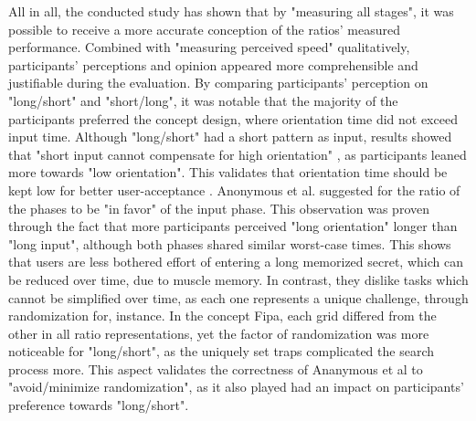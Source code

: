All in all, the conducted study has shown that by "measuring all stages", it was possible to receive a more accurate conception of the ratios' measured performance. Combined with "measuring perceived speed" qualitatively, participants' perceptions and opinion appeared more comprehensible and justifiable during the evaluation. By comparing participants' perception on "long/short" and "short/long", it was notable that the majority of the participants preferred the concept design, where orientation time did not exceed input time. Although "long/short" had a short pattern as input, results showed that "short input cannot compensate for high orientation" \cite{anonymous}, as participants leaned more towards "low orientation". This validates that orientation time should be kept low for better user-acceptance \cite{anonymous}. Anonymous et al. \cite{anonymous} suggested for the ratio of the phases to be "in favor" of the input phase. This observation was proven through the fact that more participants perceived "long orientation" longer than "long input", although both phases shared similar worst-case times. This shows that users are less bothered effort of entering a long memorized secret, which can be reduced over time, due to muscle memory. In contrast, they dislike tasks which cannot be simplified over time, as each one represents a unique challenge, through randomization for, instance. In the concept Fipa, each grid differed from the other in all ratio representations, yet the factor of randomization was more noticeable for "long/short", as the uniquely set traps complicated the search process more. This aspect validates the correctness of Ananymous et al \cite{anonymous} to "avoid/minimize randomization", as it also played had an impact on participants' preference towards "long/short". \\

